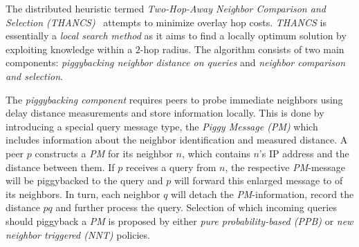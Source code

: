 
The distributed heuristic termed 
\emph{Two-Hop-Away Neighbor Comparison and Selection (THANCS)}~\cite{LNXE2005,L2008} attempts to minimize overlay hop costs.
\emph{THANCS} is essentially a \emph{local search method} as it aims 
to find a locally optimum solution by exploiting knowledge within 
a $2$-hop radius. 
The algorithm consists
of two main components: \emph{piggybacking neighbor distance on queries} and
\emph{neighbor comparison and selection}.

The \emph{piggybacking component} requires peers 
to probe immediate neighbors using delay distance measurements 
and store information locally. 
This is done by introducing a special query message type, the
\emph{Piggy Message (PM)} which includes information about 
the neighbor identification and measured distance. 
A peer $p$ constructs a \emph{PM} for its
neighbor $n$, which contains $n$'s IP address and the distance between them.
If $p$ receives a query from $n$, the respective \emph{PM}-message will 
be piggybacked to the query and $p$ will forward this enlarged message to
of its neighbors.
In turn, each neighbor $q$ will detach the \emph{PM}-information,
record the distance $pq$ and further process the query. %
Selection of which incoming queries should piggyback a \emph{PM} is proposed
by either \emph{pure probability-based (PPB)} or \emph{new neighbor triggered
(NNT)} policies. 

